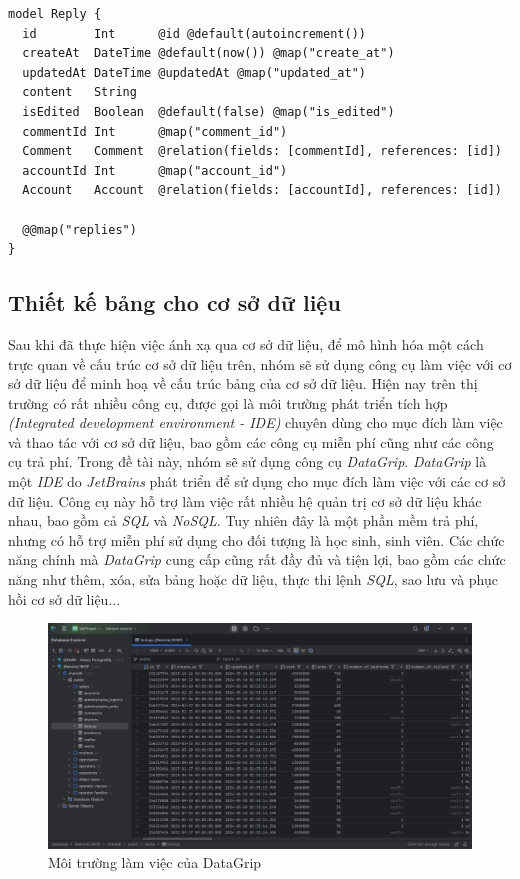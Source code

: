 {\scriptsize
\begin{lstlisting}[caption={Ánh xạ bảng Reply},captionpos=b]
model Reply {
  id        Int      @id @default(autoincrement())
  createAt  DateTime @default(now()) @map("create_at")
  updatedAt DateTime @updatedAt @map("updated_at")
  content   String
  isEdited  Boolean  @default(false) @map("is_edited")
  commentId Int      @map("comment_id")
  Comment   Comment  @relation(fields: [commentId], references: [id])
  accountId Int      @map("account_id")
  Account   Account  @relation(fields: [accountId], references: [id])

  @@map("replies")
}
\end{lstlisting}}
\subsection{Thiết kế bảng cho cơ sở dữ liệu}
\hspace*{1cm}
Sau khi đã thực hiện việc ánh xạ qua cơ sở dữ liệu, để mô hình hóa một cách trực quan về cấu trúc cơ sở dữ liệu trên, nhóm sẽ sử dụng công cụ làm việc với cơ sở dữ liệu để minh hoạ về cấu trúc bảng của cơ sở dữ liệu. Hiện nay trên thị trường có rất nhiều công cụ, được gọi là môi trường phát triển tích hợp \textit{(Integrated development environment - IDE)} chuyên dùng cho mục đích làm việc và thao tác với cơ sở dữ liệu, bao gồm các công cụ miễn phí cũng như các công cụ trả phí. Trong đề tài này, nhóm sẽ sử dụng công cụ \textit{DataGrip}. \textit{DataGrip} là một \textit{IDE} do \textit{JetBrains} phát triển để sử dụng cho mục đích làm việc với các cơ sở dữ liệu. Công cụ này hỗ trợ làm việc rất nhiều hệ quản trị cơ sở dữ liệu khác nhau, bao gồm cả \textit{SQL} và \textit{NoSQL}. Tuy nhiên đây là một phần mềm trả phí, nhưng có hỗ trợ miễn phí sử dụng cho đối tượng là học sinh, sinh viên. Các chức năng chính mà \textit{DataGrip} cung cấp cũng rất đầy đủ và tiện lợi, bao gồm các chức năng như thêm, xóa, sửa bảng hoặc dữ liệu, thực thi lệnh \textit{SQL}, sao lưu và phục hồi cơ sở dữ liệu...
\begin{figure}[H]
    \centering
    \includegraphics[width=1\textwidth]{Images/Database/DataGrip.png}
    \caption{Môi trường làm việc của DataGrip}
\end{figure}
